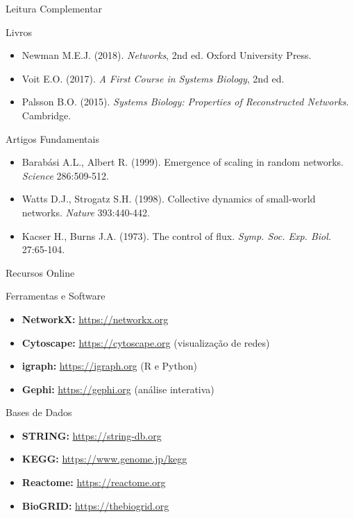 \begin{frame}[shrink=5]{Leitura Complementar}
\begin{block}{Livros}
\begin{itemize}
    \item Newman M.E.J. (2018). \textit{Networks}, 2nd ed. Oxford University Press.
    \item Voit E.O. (2017). \textit{A First Course in Systems Biology}, 2nd ed.
    \item Palsson B.O. (2015). \textit{Systems Biology: Properties of Reconstructed Networks}. Cambridge.
\end{itemize}
\end{block}

\begin{block}{Artigos Fundamentais}
\begin{itemize}
    \item Barabási A.L., Albert R. (1999). Emergence of scaling in random networks. \textit{Science} 286:509-512.
    \item Watts D.J., Strogatz S.H. (1998). Collective dynamics of small-world networks. \textit{Nature} 393:440-442.
    \item Kacser H., Burns J.A. (1973). The control of flux. \textit{Symp. Soc. Exp. Biol.} 27:65-104.
\end{itemize}
\end{block}
\end{frame}

\begin{frame}{Recursos Online}
\begin{block}{Ferramentas e Software}
\begin{itemize}
    \item \textbf{NetworkX:} \url{https://networkx.org}
    \item \textbf{Cytoscape:} \url{https://cytoscape.org} (visualização de redes)
    \item \textbf{igraph:} \url{https://igraph.org} (R e Python)
    \item \textbf{Gephi:} \url{https://gephi.org} (análise interativa)
\end{itemize}
\end{block}

\begin{block}{Bases de Dados}
\begin{itemize}
    \item \textbf{STRING:} \url{https://string-db.org}
    \item \textbf{KEGG:} \url{https://www.genome.jp/kegg}
    \item \textbf{Reactome:} \url{https://reactome.org}
    \item \textbf{BioGRID:} \url{https://thebiogrid.org}
\end{itemize}
\end{block}
\end{frame}

